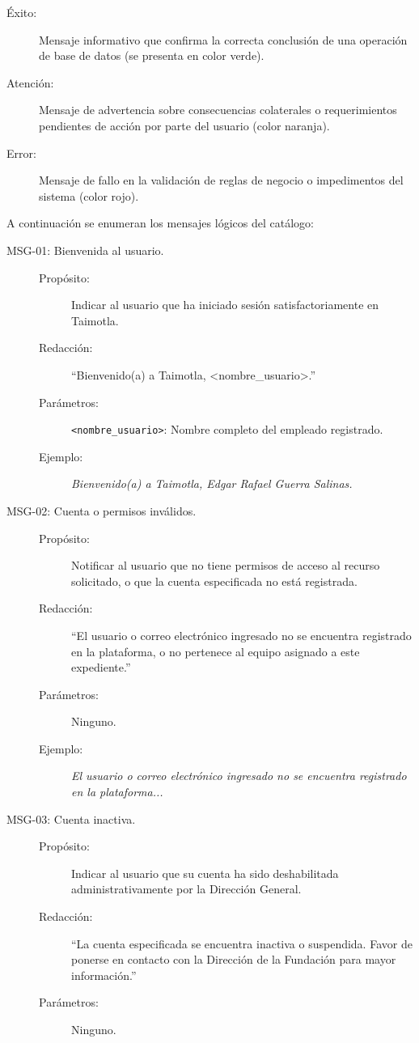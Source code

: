 \begin{description}
	\item[Éxito:] Mensaje informativo que confirma la correcta conclusión de una operación de base de datos (se presenta en color verde).
	\item[Atención:] Mensaje de advertencia sobre consecuencias colaterales o requerimientos pendientes de acción por parte del usuario (color naranja).
	\item[Error:] Mensaje de fallo en la validación de reglas de negocio o impedimentos del sistema (color rojo).
\end{description}

A continuación se enumeran los mensajes lógicos del catálogo:

\begin{description}
	\item[\hypertarget{mMSG01}{MSG-01: Bienvenida al usuario.}] \cdtEmpty
		\begin{description}
			\item[Propósito:] Indicar al usuario que ha iniciado sesión satisfactoriamente en Taimotla.
			\item[Redacción:] ``Bienvenido(a) a Taimotla, <nombre\_usuario>.''
			\item[Parámetros:] \texttt{<nombre\_usuario>}: Nombre completo del empleado registrado.
			\item[Ejemplo:] {\em Bienvenido(a) a Taimotla, Edgar Rafael Guerra Salinas.}
		\end{description}
		
	\item[\hypertarget{mMSG02}{MSG-02: Cuenta o permisos inválidos.}] \cdtEmpty
		\begin{description}
			\item[Propósito:] Notificar al usuario que no tiene permisos de acceso al recurso solicitado, o que la cuenta especificada no está registrada.
			\item[Redacción:] ``El usuario o correo electrónico ingresado no se encuentra registrado en la plataforma, o no pertenece al equipo asignado a este expediente.''
			\item[Parámetros:] Ninguno.
			\item[Ejemplo:] {\em El usuario o correo electrónico ingresado no se encuentra registrado en la plataforma...}
		\end{description}

	\item[\hypertarget{mMSG03}{MSG-03: Cuenta inactiva.}] \cdtEmpty
		\begin{description}
			\item[Propósito:] Indicar al usuario que su cuenta ha sido deshabilitada administrativamente por la Dirección General.
			\item[Redacción:] ``La cuenta especificada se encuentra inactiva o suspendida. Favor de ponerse en contacto con la Dirección de la Fundación para mayor información.''
			\item[Parámetros:] Ninguno.
		\end{description}


\end{description}
